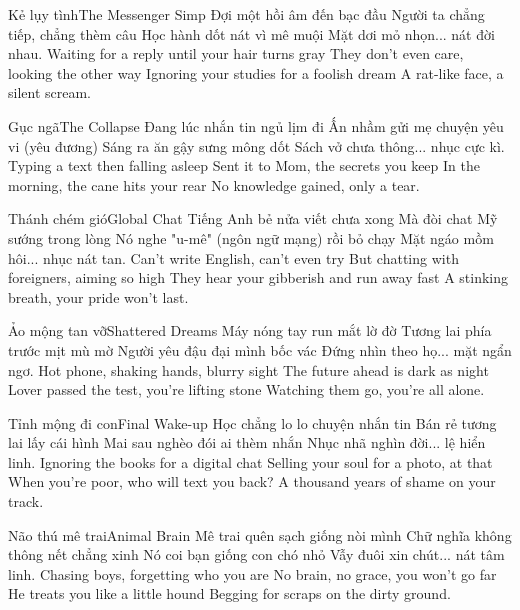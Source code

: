 \begin{tutuyetbox}{Kẻ lụy tình}{The Messenger Simp}
Đợi một hồi âm đến bạc đầu
Người ta chẳng tiếp, chẳng thèm câu
Học hành dốt nát vì mê muội
Mặt dơi mỏ nhọn... nát đời nhau.
\tcblower
Waiting for a reply until your hair turns gray
They don't even care, looking the other way
Ignoring your studies for a foolish dream
A rat-like face, a silent scream.
\end{tutuyetbox}

\begin{tutuyetbox}{Gục ngã}{The Collapse}
Đang lúc nhắn tin ngủ lịm đi
Ấn nhầm gửi mẹ chuyện yêu vi (yêu đương)
Sáng ra ăn gậy sưng mông dốt
Sách vở chưa thông... nhục cực kì.
\tcblower
Typing a text then falling asleep
Sent it to Mom, the secrets you keep
In the morning, the cane hits your rear
No knowledge gained, only a tear.
\end{tutuyetbox}

\begin{tutuyetbox}{Thánh chém gió}{Global Chat}
Tiếng Anh bẻ nửa viết chưa xong
Mà đòi chat Mỹ sướng trong lòng
Nó nghe "u-mê" (ngôn ngữ mạng) rồi bỏ chạy
Mặt ngáo mồm hôi... nhục nát tan.
\tcblower
Can't write English, can't even try
But chatting with foreigners, aiming so high
They hear your gibberish and run away fast
A stinking breath, your pride won't last.
\end{tutuyetbox}

\begin{tutuyetbox}{Ảo mộng tan vỡ}{Shattered Dreams}
Máy nóng tay run mắt lờ đờ
Tương lai phía trước mịt mù mờ
Người yêu đậu đại mình bốc vác
Đứng nhìn theo họ... mặt ngẩn ngơ.
\tcblower
Hot phone, shaking hands, blurry sight
The future ahead is dark as night
Lover passed the test, you're lifting stone
Watching them go, you're all alone.
\end{tutuyetbox}

\begin{tutuyetbox}{Tỉnh mộng đi con}{Final Wake-up}
Học chẳng lo lo chuyện nhắn tin
Bán rẻ tương lai lấy cái hình
Mai sau nghèo đói ai thèm nhắn
Nhục nhã nghìn đời... lệ hiển linh.
\tcblower
Ignoring the books for a digital chat
Selling your soul for a photo, at that
When you're poor, who will text you back?
A thousand years of shame on your track.
\end{tutuyetbox}
\begin{tutuyetbox}{Não thú mê trai}{Animal Brain}
Mê trai quên sạch giống nòi mình
Chữ nghĩa không thông nết chẳng xinh
Nó coi bạn giống con chó nhỏ
Vẫy đuôi xin chút... nát tâm linh.
\tcblower
Chasing boys, forgetting who you are
No brain, no grace, you won't go far
He treats you like a little hound
Begging for scraps on the dirty ground.
\end{tutuyetbox}

